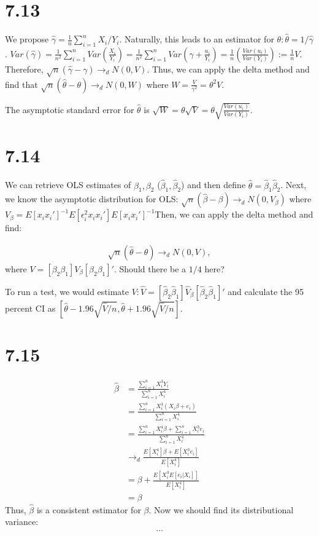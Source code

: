 \documentclass[11pt]{article} %
\begin{document}
\section{7.13}
We propose $\hat{\gamma} = \frac{1}{n}\sum_{i=1}^n X_i/Y_i$. Naturally, this leads to an estimator for $\theta: \hat{\theta} = 1/\hat{\gamma}$. $Var(\hat{\gamma}) = \frac{1}{n^2} \sum_{i=1}^{n}Var\left( \frac{X_i}{Y_i} \right) = \frac{1}{n^2} \sum_{i=1}^{n}Var\left( \gamma + \frac{u_i}{Y_i} \right) = \frac{1}{n} \left( \frac{Var(u_i)}{Var(Y_i)} \right):= \frac{1}{n}V$. Therefore, $\sqrt{n}(\hat{\gamma} - \gamma) \rightarrow_d N(0,V).$ Thus, we can apply the delta method and find that $\sqrt{n}(\hat{\theta} - \theta) \rightarrow_d N(0,W)$ where $W = \frac{V}{\gamma^2} = \theta^2V$.

The asymptotic standard error for $\hat{\theta}$ is $\sqrt{W} = \theta \sqrt{V} = \theta \sqrt{\frac{Var(u_i)}{Var(Y_i)}}.$

\section{7.14}
We can retrieve OLS estimates of $\beta_1,\beta_2$ ($\hat{\beta}_1,\hat{\beta}_2$) and then define $\hat{\theta} = \hat{\beta}_1 \hat{\beta}_2$. Next, we know the asymptotic distribution for OLS: $\sqrt{n}(\hat{\beta} - \beta) \rightarrow_d N(0,V_\beta)$ where $V_{\beta} = E[x_ix_i']^{-1} E[\epsilon_i^2x_ix_i']  E[x_ix_i']^{-1} $Then, we can apply the delta method and find:

\begin{align*}
\sqrt{n}(\hat{\theta} - \theta) \rightarrow_d N(0,V),
\end{align*}
where $V = [\beta_2 \beta_1]V_{\beta} [\beta_2 \beta_1 ]'$. Should there be a $1/4$ here?

To run a test, we would estimate $V: \hat{V} = [\hat{\beta}_2 \hat{\beta}_1]\hat{V}_{\beta}[\hat{\beta}_2 \hat{\beta}_1]'$ and calculate the 95 percent CI as $\left[\hat{\theta} - 1.96\sqrt{\hat{V}/n},\hat{\theta} + 1.96\sqrt{\hat{V}/n}\right]$.

\section{7.15}

\begin{align*}
\hat{\beta} &= \frac{\sum_{i=1}^n X_i^3 Y_i}{\sum_{i=1}^nX_i^4} \\
&= \frac{\sum_{i=1}^n X_i^3 (X_i \beta + e_i)}{\sum_{i=1}^nX_i^4} \\
&=  \frac{\sum_{i=1}^n X_i^4\beta + \sum_{i=1}^nX_i^3e_i}{\sum_{i=1}^nX_i^4}\\
&\rightarrow_d \frac{E[X_i^4]\beta + E[X_i^3e_i]}{E[X_i^4]}\\
&=\beta + \frac{E[X_i^3E[e_i|X_i]]}{E[X_i^4]}\\
&= \beta
\end{align*}
Thus, $\hat{\beta}$ is a consistent estimator for $\beta$. Now we should find its distributional variance:
\begin{align*}
\dots
\end{align*}
\end{document}
